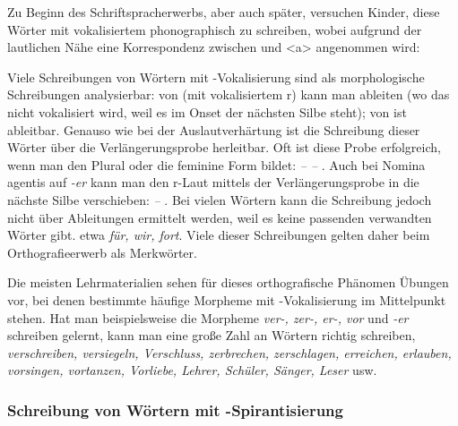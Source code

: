 Zu Beginn des Schriftspracherwerbs, aber auch später, versuchen Kinder, diese Wörter mit vokalisiertem  phonographisch zu schreiben, wobei aufgrund der lautlichen Nähe eine Korrespondenz zwischen \textipa{[5]} und <a> angenommen wird:

\ea \label{rVokalisierung}
\label{ea:rVokalisierung1}
 \label{ea:rVokalisierung2}
 \label{ea:rVokalisierung3}
\label{ea:rVokalisierung4}
\z
\z

Viele Schreibungen von Wörtern mit -Vokalisierung sind als morphologische Schreibungen analysierbar: von \textit{} (mit vokalisiertem r) kann man \textit{} ableiten (wo das  nicht vokalisiert wird, weil es im Onset der nächsten Silbe steht); von \textit{} ist \textit{} ableitbar. Genauso wie bei der Auslautverhärtung ist die Schreibung dieser Wörter über die Verlängerungsprobe herleitbar. Oft ist diese Probe erfolgreich, wenn man den Plural oder die feminine Form bildet: \textit{ --  -- }. Auch bei Nomina agentis auf \textit{-er} kann man den r-Laut mittels der Verlängerungsprobe in die nächste Silbe verschieben: \textit{ -- }. Bei vielen Wörtern kann die Schreibung jedoch nicht über Ableitungen ermittelt werden, weil es keine passenden verwandten Wörter gibt. etwa \textit{für, wir, fort}. Viele dieser Schreibungen gelten daher beim Orthografieerwerb als Merkwörter. 

Die meisten Lehrmaterialien sehen für dieses orthografische Phänomen Übungen vor, bei denen bestimmte häufige Morpheme mit -Vokalisierung im Mittelpunkt stehen. Hat man beispielsweise die Morpheme \textit{ver-, zer-, er-, vor} und \textit{-er} schreiben gelernt, kann man eine große Zahl an Wörtern richtig schreiben, \zB \textit{verschreiben, versiegeln, Verschluss, zerbrechen, zerschlagen, erreichen, erlauben, vorsingen, vortanzen, Vorliebe, Lehrer, Schüler, Sänger, Leser} usw.


\subsubsection{Schreibung von Wörtern mit -Spirantisierung}

